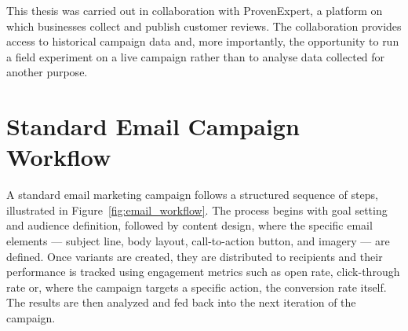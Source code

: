 This thesis was carried out in collaboration with ProvenExpert, a platform on which businesses collect and publish customer reviews. The collaboration provides access to historical campaign data and, more importantly, the opportunity to run a field experiment on a live campaign rather than to analyse data collected for another purpose.
\vspace{1.0cm}

\section*{Standard Email Campaign Workflow}

A standard email marketing campaign follows a structured sequence of steps, illustrated in
Figure~\ref{fig:email_workflow}. The process begins with goal setting and audience
definition, followed by content design, where the specific email elements --- subject
line, body layout, call-to-action button, and imagery --- are defined. Once variants are
created, they are distributed to recipients and their performance is tracked using engagement
metrics such as open rate, click-through rate or, where the campaign targets a
specific action, the conversion rate itself. The results are then
analyzed and fed back into the next iteration of the campaign.

